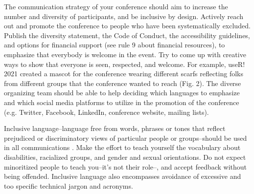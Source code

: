 \documentclass[10pt,letterpaper]{article}
\begin{document}
The communication strategy of your conference should aim to increase the number and diversity of participants, and be inclusive by design.
Actively reach out and promote the conference to people who have been systematically excluded. 
Publish the diversity statement, the Code of Conduct, the accessibility guidelines, and  options for financial support (see rule 9 about financial resources), to emphasize that everybody is welcome in the event.
Try to come up with creative ways to show that everyone is seen, respected, and welcome. For example, useR! 2021 created a mascot for the conference wearing different scarfs reflecting folks from different groups that the conference wanted to reach (Fig. 2). 
The diverse organizing team should be able to help deciding which languages to emphasize and which social media platforms to utilize in the promotion of the conference (e.g. Twitter, Facebook, LinkedIn, conference website, mailing lists).

Inclusive language--language free from words, phrases or tones that reflect prejudiced or discriminatory views of particular people or groups--should be used in all communications \cite{hallDesigningDiversityInclusion2019}. 
Make the effort to teach yourself the vocabulary about disabilities, racialized groups, and gender and sexual orientations. %
Do not expect minoritized people to teach you--it's not their role--, and accept feedback without being offended.
Inclusive language also encompasses avoidance of excessive and too specific technical jargon and acronyms. 
%

\end{document}
